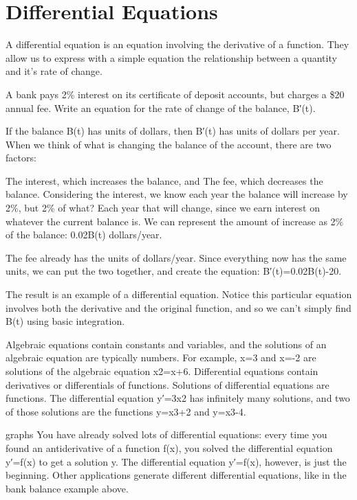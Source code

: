 \section{Differential Equations}
\label{sec:diff-eqs}
A differential equation is an equation involving the derivative of a function. They allow us to express with a simple equation the relationship between a quantity and it's rate of change.

\begin{example}
A bank pays 2\% interest on its certificate of deposit accounts, but charges a \$20 annual fee. Write an equation for the rate of change of the balance, B′(t).

\begin{solution}
  If the balance B(t) has units of dollars, then B′(t) has units of dollars per year. When we think of what is changing the balance of the account, there are two factors:

The interest, which increases the balance, and
The fee, which decreases the balance.
Considering the interest, we know each year the balance will increase by 2\%, but 2\% of what? Each year that will change, since we earn interest on whatever the current balance is. We can represent the amount of increase as 2\% of the balance: 0.02B(t) dollars/year.

The fee already has the units of dollars/year. Since everything now has the same units, we can put the two together, and create the equation:
B′(t)=0.02B(t)-20.
\end{solution}\end{example}

The result is an example of a differential equation. Notice this particular equation involves both the derivative and the original function, and so we can't simply find B(t) using basic integration.

Algebraic equations contain constants and variables, and the solutions of an algebraic equation are typically numbers. For example, x=3 and x=-2 are solutions of the algebraic equation x2=x+6. Differential equations contain derivatives or differentials of functions. Solutions of differential equations are functions. The differential equation y′=3x2 has infinitely many solutions, and two of those solutions are the functions y=x3+2 and y=x3-4.

graphs
You have already solved lots of differential equations: every time you found an antiderivative of a function f(x), you solved the differential equation y′=f(x) to get a solution y. The differential equation y′=f(x), however, is just the beginning. Other applications generate different differential equations, like in the bank balance example above.

